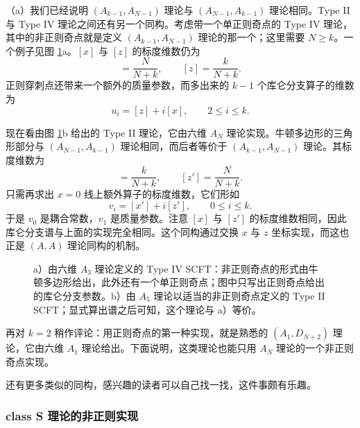 （a）我们已经说明 $(A_{k-1},A_{N-1})$ 理论与 $(A_{N-1},A_{k-1})$ 理论相同。Type II 与 Type IV 理论之间还有另一个同构。考虑带一个单正则奇点的 Type IV 理论，其中的非正则奇点就是定义 $(A_{k-1},A_{N-1})$ 理论的那一个；这里需要 $N\ge k$。一个例子见图 \ref{fig:18}a。$[x]$ 与 $[z]$ 的标度维数仍为
\begin{equation}
[x] = \frac{N}{N+k},\qquad [z] = \frac{k}{N+k} .
\label{eq:6.28}\tag{6.28}
\end{equation}
正则穿刺点还带来一个额外的质量参数，而多出来的 $k-1$ 个库仑分支算子的维数为
\begin{equation}
u_i = [z]+i[x],\qquad 2\le i\le k .
\label{eq:6.29}\tag{6.29}
\end{equation}

现在看由图 \ref{fig:18}b 给出的 Type II 理论，它由六维 $A_N$ 理论实现。牛顿多边形的三角形部分与 $(A_{N-1},A_{k-1})$ 理论相同，而后者等价于 $(A_{k-1},A_{N-1})$ 理论。其标度维数为
\begin{equation}
[x'] = \frac{k}{N+k},\qquad [z'] = \frac{N}{N+k} .
\label{eq:6.30}\tag{6.30}
\end{equation}
只需再求出 $x=0$ 线上额外算子的标度维数，它们形如
\begin{equation}
v_i = [x']+i[z'],\qquad 0\le i\le k .
\label{eq:6.31}\tag{6.31}
\end{equation}
于是 $v_0$ 是耦合常数，$v_1$ 是质量参数。注意 $[x]$ 与 $[z']$ 的标度维数相同，因此库仑分支谱与上面的实现完全相同。这个同构通过交换 $x$ 与 $z$ 坐标实现，而这也正是 $(A,A)$ 理论同构的机制。

\begin{figure}[tbp]
\centering

\caption{a）由六维 $A_3$ 理论定义的 Type IV SCFT：非正则奇点的形式由牛顿多边形给出，此外还有一个单正则奇点；图中只写出正则奇点给出的库仑分支参数。b）由 $A_5$ 理论以适当的非正则奇点定义的 Type II SCFT；显式算出谱之后可知，这个理论与 a）等价。}
\label{fig:18}
\end{figure}

再对 $k=2$ 稍作评论：用正则奇点的第一种实现，就是熟悉的 $(A_1,D_{N+2})$ 理论，它由六维 $A_1$ 理论给出。下面说明，这类理论也能只用 $A_N$ 理论的一个非正则奇点实现。

还有更多类似的同构，感兴趣的读者可以自己找一找，这件事颇有乐趣。

\subsubsection{class S 理论的非正则实现}
\label{sec:6.3.1}

